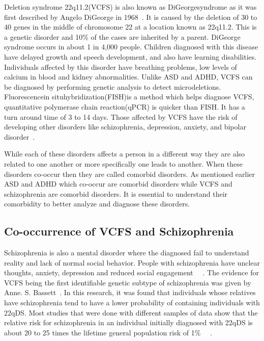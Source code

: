 Deletion syndrome 22q11.2(VCFS) is also known as DiGeorgesyndrome as it was first described by Angelo DiGeorge in 1968~\cite{digeorge1968congenital,restivo200622q11}. It is caused by the deletion of 30 to 40 genes in the middle of chromosome 22 at a location known as 22q11.2. This is a genetic disorder and 10\% of the cases are inherited by a parent. DiGeorge syndrome occurs in about 1 in 4,000 people. Children diagnosed with this disease have delayed growth and speech development, and also have learning disabilities. Individuals affected by this disorder have breathing problems, low levels of calcium in blood and kidney abnormalities. Unlike ASD and ADHD, VCFS can be diagnosed by performing genetic analysis to detect microdeletions. Fluorescencein situhybridization(FISH)is a method which helps diagnose VCFS, quantitative polymerase chain reaction(qPCR) is quicker than FISH. It has a turn around time of 3 to 14 days. Those affected by VCFS have the risk of developing other disorders like schizophrenia, depression, anxiety, and bipolar disorder~\cite{mcdonald2011chromosome}.

While each of these disorders affects a person in a different way they are also related to one another or more specifically one leads to another. When these disorders co-occur then they are called comorbid disorders. As mentioned earlier ASD and ADHD which co-occur are comorbid disorders while VCFS and schizophrenia are comorbid disorders. It is essential to understand their comorbidity to better analyze and diagnose these disorders.
\subsection{Co-occurrence of VCFS and Schizophrenia}
Schizophrenia is also a mental disorder where the diagnosed fail to understand reality and lack of normal social behavior. People with schizophrenia have unclear thoughts, anxiety, depression and reduced social engagement~\cite{cross2017external} ~\cite{webpage1}. The evidence for VCFS being the first identifiable genetic subtype of schizophrenia was given by Anne. S. Bassett~\cite{bassett2008schizophrenia}. In this research, it was found that individuals whose relatives have schizophrenia tend to have a lower probability of containing individuals with 22qDS. Most studies that were done with different samples of data show that the relative risk for schizophrenia in an individual initially diagnosed with 22qDS is about 20 to 25 times the lifetime general population risk of 1\% ~\cite{bassett2000chromosomal}~\cite{hodgkinson2001genetic}.


